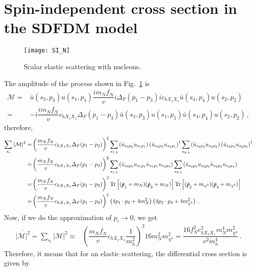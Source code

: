 \section{Spin-independent cross section in the SDFDM model}
\label{sec:SI-amplitude}
%
\begin{figure}[h]
  \centering
  \texttt{[image: SI\_N]}
  \caption{Scalar elastic scattering with nucleons.}
  \label{fig:SI_N}
\end{figure}
%
The amplitude of the process shown in Fig.~\ref{fig:SI_N} is
\begin{align}
\mathcal{M}=&\bar{u}(s_3,p_3)u(s_1,p_1)\dfrac{im_Nf_N}{v}i\Delta_F(p_1-p_3)ic_{hX_1X_1}\bar{u}(s_4,p_4)u(s_2,p_2)\nonumber\\
=& -i\dfrac{im_Nf_N}{v}c_{hX_1X_1}\Delta_F(p_1-p_3) \bar{u}(s_3,p_3)u(s_1,p_1)\bar{u}(s_4,p_4)u(s_2,p_2)\,,
\end{align}
therefore,
\begin{align}
\sum_{s_i}|\mathcal{M}|^2=&\left(\dfrac{m_Nf_N}{v}c_{hX_1X_1}\Delta_F(p_1-p_3)\right)^2
\sum_{s_{1,3}}\left(\bar{u}_{s_3p_3}u_{s_1p_1}\right)\left(\bar{u}_{s_3p_3}u_{s_1p_1}\right)^{\dagger}
\sum_{s_{2,4}}\left(\bar{u}_{s_4p_4}u_{s_2p_2}\right)\left(\bar{u}_{s_4p_4}u_{s_2p_2}\right)^{\dagger}\nonumber\\
=&\left(\dfrac{m_Nf_N}{v}c_{hX_1X_1}\Delta_F(p_1-p_3)\right)^2
\sum_{s_{1,3}}\left(\bar{u}_{s_3p_3}u_{s_1p_1}\bar{u}_{s_1p_1}u_{s_3p_3}\right)
\sum_{s_{2,4}}\left(\bar{u}_{s_4p_4}u_{s_2p_2}\bar{u}_{s_2p_2}u_{s_4p_4}\right)\nonumber\\
=&\left(\dfrac{m_Nf_N}{v}c_{hX_1X_1}\Delta_F(p_1-p_3)\right)^2
\text{Tr}\left[(\slashed{p}_1+m_N)(\slashed{p}_3+m_N)\right]
\text{Tr}\left[(\slashed{p}_2+m_{\chi^0})(\slashed{p}_4+m_{\chi^0})\right]\nonumber\\
=&\left(\dfrac{m_Nf_N}{v}c_{hX_1X_1}\Delta_F(p_1-p_3)\right)^2
\left(4p_1\cdot p_3+4m_N^2\right)\left(4p_2\cdot
p_4+4m_{\chi^0}^2\right)\,.
\end{align}
Now, if we do the approximation of $p_i\to0$, we get
\begin{align}
\overline{|\mathcal{M}|^2}=\sum_{s_i}|\mathcal{M}|^2\approx&\left(\dfrac{m_Nf_N}{v}c_{hX_1X_1}\dfrac{1}{m_h^2}\right)^2 16m_N^2m_{\chi^0}^2
=\dfrac{16f_N^2c_{hX_1X_1}^2m_N^4m_{\chi^0}^2}{v^2m_h^4}\,.
\end{align}
Therefore, it means that for an elastic scattering, the differential cross section is given by
